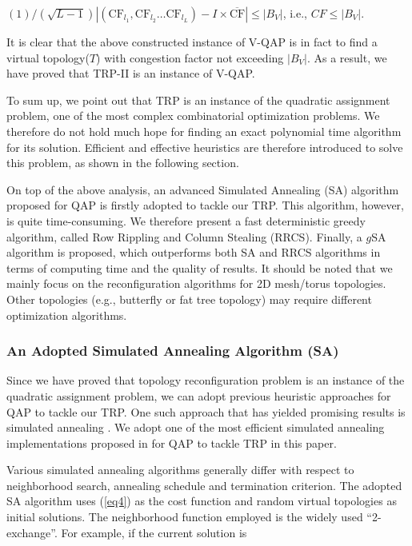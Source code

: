 $(1) /(\sqrt{L-1})\left|\left(\mathrm{CF}_{l_{1}}, \mathrm{CF}_{l_{2}} \ldots \mathrm{CF}_{l_{L}}\right)-I \times \overline{\mathrm{CF}}\right| \leq\left|B_{V}\right|$, i.e., $C F \leq\left|B_{V}\right|$.

It is clear that the above constructed instance of V-QAP is in fact to find a virtual topology($T$) with congestion factor not exceeding $\left|B_{V}\right|$. As a result, we have proved that TRP-II is an instance of V-QAP.

To sum up, we point out that TRP is an instance of the quadratic assignment problem, one of the most complex combinatorial optimization problems. We therefore do not hold much hope for finding an exact polynomial time algorithm for its solution. Efficient and effective heuristics are therefore introduced to solve this problem, as shown in the following section.

On top of the above analysis, an advanced Simulated Annealing (SA) algorithm proposed for QAP is firstly adopted to tackle our TRP. This algorithm, however, is quite time-consuming. We therefore present a fast deterministic greedy algorithm, called Row Rippling and Column Stealing (RRCS). Finally, a $g$SA algorithm is proposed, which outperforms both SA and RRCS algorithms in terms of computing time and the quality of results. It should be noted that we mainly focus on the reconfiguration algorithms for 2D mesh/torus topologies. Other topologies (e.g., butterfly or fat tree topology) may require different optimization algorithms.

\subsubsection{An Adopted Simulated Annealing Algorithm (SA)}
Since we have proved that topology reconfiguration problem is an instance of the quadratic assignment problem, we can adopt previous heuristic approaches for QAP to tackle our TRP. One such approach that has yielded promising results is simulated annealing \cite{misevivcius2003modified,burkard1984thermodynamically,connolly1990improved,bolte1996optimizing}. We adopt one of the most efficient simulated annealing implementations proposed in \cite{misevivcius2003modified} for QAP to tackle TRP in this paper.

Various simulated annealing algorithms generally differ with respect to neighborhood search, annealing schedule and termination criterion. The adopted SA algorithm uses (\ref{eq4}) as the cost function and random virtual topologies as initial solutions. The neighborhood function employed is the widely used “2-exchange”. For example, if the current solution is

